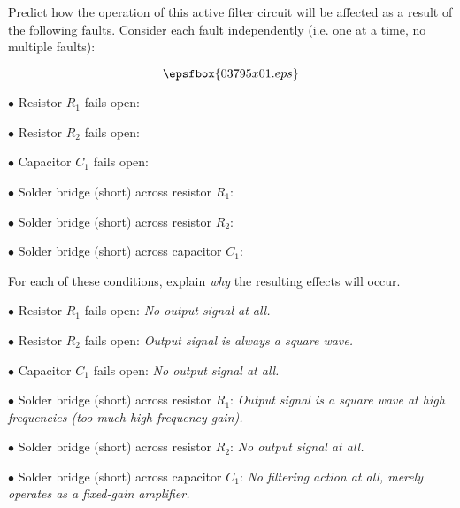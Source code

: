 

Predict how the operation of this active filter circuit will be affected as a result of the following faults.  Consider each fault independently (i.e. one at a time, no multiple faults):

$$\epsfbox{03795x01.eps}$$

\medskip
\item{$\bullet$} Resistor $R_1$ fails open:
\vskip 5pt
\item{$\bullet$} Resistor $R_2$ fails open:
\vskip 5pt
\item{$\bullet$} Capacitor $C_1$ fails open:
\vskip 5pt
\item{$\bullet$} Solder bridge (short) across resistor $R_1$:
\vskip 5pt
\item{$\bullet$} Solder bridge (short) across resistor $R_2$:
\vskip 5pt
\item{$\bullet$} Solder bridge (short) across capacitor $C_1$:
\medskip

For each of these conditions, explain {\it why} the resulting effects will occur.







\medskip
\item{$\bullet$} Resistor $R_1$ fails open: {\it No output signal at all.}
\vskip 5pt
\item{$\bullet$} Resistor $R_2$ fails open: {\it Output signal is always a square wave.}
\vskip 5pt
\item{$\bullet$} Capacitor $C_1$ fails open: {\it No output signal at all.}
\vskip 5pt
\item{$\bullet$} Solder bridge (short) across resistor $R_1$: {\it Output signal is a square wave at high frequencies (too much high-frequency gain).} 
\vskip 5pt
\item{$\bullet$} Solder bridge (short) across resistor $R_2$: {\it No output signal at all.}
\vskip 5pt
\item{$\bullet$} Solder bridge (short) across capacitor $C_1$: {\it No filtering action at all, merely operates as a fixed-gain amplifier.} 
\medskip






